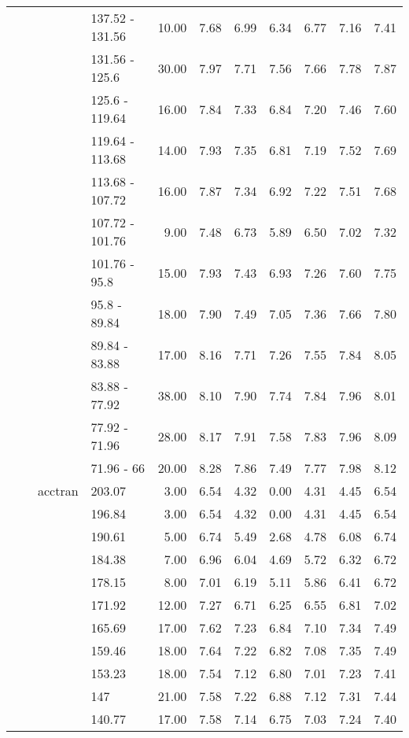 \begin{longtable}{llllrrrrrrr}
   &  &  & 137.52 - 131.56 & 10.00 & 7.68 & 6.99 & 6.34 & 6.77 & 7.16 & 7.41 \\ 
   &  &  & 131.56 - 125.6 & 30.00 & 7.97 & 7.71 & 7.56 & 7.66 & 7.78 & 7.87 \\ 
   &  &  & 125.6 - 119.64 & 16.00 & 7.84 & 7.33 & 6.84 & 7.20 & 7.46 & 7.60 \\ 
   &  &  & 119.64 - 113.68 & 14.00 & 7.93 & 7.35 & 6.81 & 7.19 & 7.52 & 7.69 \\ 
   &  &  & 113.68 - 107.72 & 16.00 & 7.87 & 7.34 & 6.92 & 7.22 & 7.51 & 7.68 \\ 
   &  &  & 107.72 - 101.76 & 9.00 & 7.48 & 6.73 & 5.89 & 6.50 & 7.02 & 7.32 \\ 
   &  &  & 101.76 - 95.8 & 15.00 & 7.93 & 7.43 & 6.93 & 7.26 & 7.60 & 7.75 \\ 
   &  &  & 95.8 - 89.84 & 18.00 & 7.90 & 7.49 & 7.05 & 7.36 & 7.66 & 7.80 \\ 
   &  &  & 89.84 - 83.88 & 17.00 & 8.16 & 7.71 & 7.26 & 7.55 & 7.84 & 8.05 \\ 
   &  &  & 83.88 - 77.92 & 38.00 & 8.10 & 7.90 & 7.74 & 7.84 & 7.96 & 8.01 \\ 
   &  &  & 77.92 - 71.96 & 28.00 & 8.17 & 7.91 & 7.58 & 7.83 & 7.96 & 8.09 \\ 
   &  &  & 71.96 - 66 & 20.00 & 8.28 & 7.86 & 7.49 & 7.77 & 7.98 & 8.12 \\ 
   &  & acctran & 203.07 & 3.00 & 6.54 & 4.32 & 0.00 & 4.31 & 4.45 & 6.54 \\ 
   &  &  & 196.84 & 3.00 & 6.54 & 4.32 & 0.00 & 4.31 & 4.45 & 6.54 \\ 
   &  &  & 190.61 & 5.00 & 6.74 & 5.49 & 2.68 & 4.78 & 6.08 & 6.74 \\ 
   &  &  & 184.38 & 7.00 & 6.96 & 6.04 & 4.69 & 5.72 & 6.32 & 6.72 \\ 
   &  &  & 178.15 & 8.00 & 7.01 & 6.19 & 5.11 & 5.86 & 6.41 & 6.72 \\ 
   &  &  & 171.92 & 12.00 & 7.27 & 6.71 & 6.25 & 6.55 & 6.81 & 7.02 \\ 
   &  &  & 165.69 & 17.00 & 7.62 & 7.23 & 6.84 & 7.10 & 7.34 & 7.49 \\ 
   &  &  & 159.46 & 18.00 & 7.64 & 7.22 & 6.82 & 7.08 & 7.35 & 7.49 \\ 
   &  &  & 153.23 & 18.00 & 7.54 & 7.12 & 6.80 & 7.01 & 7.23 & 7.41 \\ 
   &  &  & 147 & 21.00 & 7.58 & 7.22 & 6.88 & 7.12 & 7.31 & 7.44 \\ 
   &  &  & 140.77 & 17.00 & 7.58 & 7.14 & 6.75 & 7.03 & 7.24 & 7.40 \\ 

\end{longtable}

